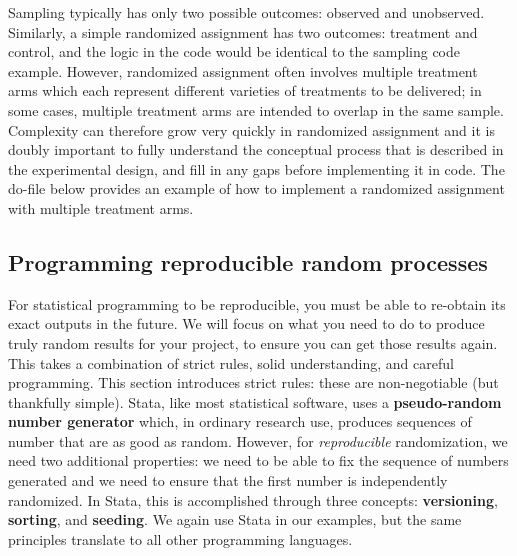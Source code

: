 
Sampling typically has only two possible outcomes: observed and unobserved.
Similarly, a simple randomized assignment has two outcomes: treatment and control,
and the logic in the code would be identical to the sampling code example.
However, randomized assignment often involves multiple treatment arms
which each represent different varieties of treatments to be delivered;
in some cases, multiple treatment arms are intended to overlap in the same sample.
Complexity can therefore grow very quickly in randomized assignment
and it is doubly important to fully understand the conceptual process
that is described in the experimental design,
and fill in any gaps before implementing it in code.
The do-file below provides an example of how to implement
a randomized assignment with multiple treatment arms.



\subsection{Programming reproducible random processes}

For statistical programming to be reproducible,
you must be able to re-obtain its exact outputs in the future.
We will focus on what you need to do to produce
truly random results for your project,
to ensure you can get those results again.
This takes a combination of strict rules, solid understanding, and careful programming.
This section introduces strict rules:
these are non-negotiable (but thankfully simple).
Stata, like most statistical software, uses a \textbf{pseudo-random number generator}
which, in ordinary research use,
produces sequences of number that are as good as random.
However, for \textit{reproducible} randomization, we need two additional properties:
we need to be able to fix the sequence of numbers generated and
we need to ensure that the first number is independently randomized.
In Stata, this is accomplished through three concepts:
\textbf{versioning}, \textbf{sorting}, and \textbf{seeding}.
We again use Stata in our examples,
but the same principles translate to all other programming languages.

